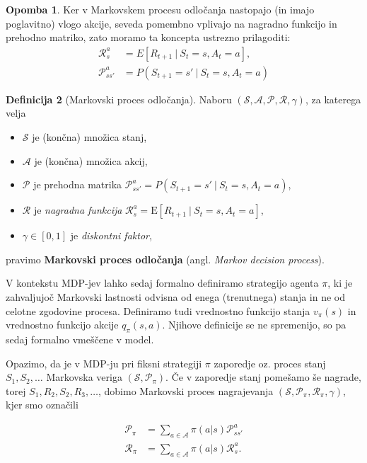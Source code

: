 \documentclass[12pt,a4paper]{amsart}
\theoremstyle{definition} %
\newtheorem{definicija}{Definicija}[section]
\newtheorem{opomba}[definicija]{Opomba}
\theoremstyle{plain} %
\begin{document}
\begin{opomba}
    Ker v Markovskem procesu odločanja nastopajo (in imajo poglavitno) vlogo akcije, seveda pomembno 
    vplivajo na nagradno funkcijo in prehodno matriko, zato moramo ta koncepta ustrezno prilagoditi:
    \begin{align*}
    \mathcal{R}_s^a &= E[R_{t+1}~|~S_{t} = s, A_t = a], \\
    \mathcal{P}_{ss'}^a &= P(S_{t+1} = s'~|~S_t = s, A_t = a)
    \end{align*}
\end{opomba}

\begin{definicija}[Markovski proces odločanja]
    Naboru $(\mathcal{S}, \mathcal{A}, \mathcal{P}, \mathcal{R}, \gamma)$, za katerega velja
    \begin{itemize}
        \item $\mathcal{S}$ je (končna) množica stanj,
        \item $\mathcal{A}$ je (končna) množica akcij, 
        \item $\mathcal{P}$ je prehodna matrika $\mathcal{P}_{ss'}^a = P(S_{t+1} = s'~|~
                S_t = s, A_t = a)$, 
        \item $\mathcal{R}$ je \textit{nagradna funkcija} 
                $\mathcal{R}_s^a = \mathrm{E}[R_{t+1}~|~S_{t} = s, A_t = a]$, 
        \item $\gamma \in [0,1]$ je \textit{diskontni faktor}, 
    \end{itemize}
    pravimo \textbf{Markovski proces odločanja} (angl. \textit{Markov decision process}).
\end{definicija}

V kontekstu MDP-jev lahko sedaj formalno definiramo strategijo agenta $\pi$, ki je zahvaljujoč 
Markovski lastnosti odvisna od enega (trenutnega) stanja in ne od celotne zgodovine procesa. 
Definiramo tudi vrednostno funkcijo stanja $v_{\pi}(s)$ in vrednostno funkcijo akcije $q_{\pi}(s, a)$. 
Njihove definicije se ne spremenijo, so pa sedaj formalno vmeščene v model.

Opazimo, da je v MDP-ju pri fiksni strategiji $\pi$ zaporedje oz. proces stanj $S_1, S_2, \dots$ 
Markovska veriga $(\mathcal{S}, \mathcal{P}_\pi)$. Če v zaporedje stanj pomešamo še nagrade, 
torej $S_1, R_2, S_2, R_3, \dots$, dobimo Markovski proces nagrajevanja $(\mathcal{S}, 
\mathcal{P}_\pi, \mathcal{R}_\pi, \gamma)$, kjer smo označili

\begin{align*}
    \mathcal{P}_\pi &= \sum_{a \in \mathcal{A}} \pi(a|s) \mathcal{P}_{ss'}^a \\
    \mathcal{R}_\pi &= \sum_{a \in \mathcal{A}} \pi(a|s) \mathcal{R}_{s}^a. 
    \end{align*}
\end{document}
